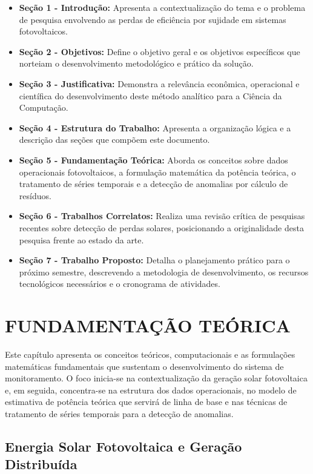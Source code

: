 \documentclass{UNESC}
\begin{document}
\begin{itemize}
    \item \textbf{Seção 1 - Introdução:} Apresenta a contextualização do tema e o problema de pesquisa envolvendo as perdas de eficiência por sujidade em sistemas fotovoltaicos.
    \item \textbf{Seção 2 - Objetivos:} Define o objetivo geral e os objetivos específicos que norteiam o desenvolvimento metodológico e prático da solução.
    \item \textbf{Seção 3 - Justificativa:} Demonstra a relevância econômica, operacional e científica do desenvolvimento deste método analítico para a Ciência da Computação.
    \item \textbf{Seção 4 - Estrutura do Trabalho:} Apresenta a organização lógica e a descrição das seções que compõem este documento.
    \item \textbf{Seção 5 - Fundamentação Teórica:} Aborda os conceitos sobre dados operacionais fotovoltaicos, a formulação matemática da potência teórica, o tratamento de séries temporais e a detecção de anomalias por cálculo de resíduos.
    \item \textbf{Seção 6 - Trabalhos Correlatos:} Realiza uma revisão crítica de pesquisas recentes sobre detecção de perdas solares, posicionando a originalidade desta pesquisa frente ao estado da arte.
    \item \textbf{Seção 7 - Trabalho Proposto:} Detalha o planejamento prático para o próximo semestre, descrevendo a metodologia de desenvolvimento, os recursos tecnológicos necessários e o cronograma de atividades.
\end{itemize}

\section{FUNDAMENTAÇÃO TEÓRICA}

Este capítulo apresenta os conceitos teóricos, computacionais e as formulações matemáticas fundamentais que sustentam o desenvolvimento do sistema de monitoramento. O foco inicia-se na contextualização da geração solar fotovoltaica e, em seguida, concentra-se na estrutura dos dados operacionais, no modelo de estimativa de potência teórica que servirá de linha de base e nas técnicas de tratamento de séries temporais para a detecção de anomalias.

\subsection{Energia Solar Fotovoltaica e Geração Distribuída}
\end{document}
